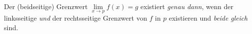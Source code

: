Der (beidseitige) Grenzwert $\lim\limits_{x \to p} f(x) = g$ existiert \textit{genau dann}, wenn der linksseitige \textit{und} der rechtsseitige Grenzwert von $f$ in $p$ existieren und \textit{beide gleich} sind.